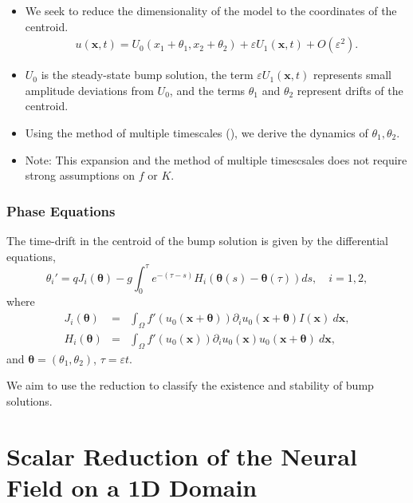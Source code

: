 \documentclass{beamer}
\newcommand{\x}{\mathbf{x}}
\newcommand{\q}{\boldsymbol{\theta}}
\newcommand{\io}{\int_\Omega}
\newcommand{\ve}{\varepsilon}
\newcommand{\pa}{\partial}
\begin{document}
\begin{frame}
\begin{itemize}
\item We seek to reduce the dimensionality of the model to the coordinates of the centroid.
  \begin{equation*}
  \begin{split}
   u(\x,t) = U_0(x_1+\theta_1,x_2+\theta_2) + \ve U_1(\x,t) + O(\ve^2).
  \end{split}
 \end{equation*}
 \item $U_0$ is the steady-state bump solution, the term $\ve U_1(\x,t)$ represents small amplitude deviations from $U_0$, and the terms $\theta_1$ and $\theta_2$ represent drifts of the centroid.
 \item Using the method of multiple timescales (\cite{keener}), we derive the dynamics of $\theta_1, \theta_2$.
 \item Note: This expansion and the method of multiple timescsales does not require strong assumptions on $f$ or $K$.
\end{itemize}
\end{frame}

\begin{frame}
\frametitle{Phase Equations}
The time-drift in the centroid of the bump solution is given by the differential equations,
\begin{equation*}
\theta_i' = qJ_i(\q) -g\int_0^\tau e^{-(\tau-s)} H_i(\q(s)-\q(\tau))ds, \quad i=1,2,
\end{equation*}
where
\begin{eqnarray*}
J_i(\q) &=& \io f'(u_0(\x+\q))\pa_i u_0(\x+\q)I(\x)\ d\x,\\
H_i(\q) &=& \io f'(u_0(\x))\pa_i u_0(\x) u_0(\x+\q)\ d\x,
\end{eqnarray*} 
and $\q = (\theta_1,\theta_2)$, $\tau = \ve t$.

We aim to use the reduction to classify the existence and stability of bump solutions.
\end{frame}

\section[Scalar Reduction (1D)]{Scalar Reduction of the Neural Field on a 1D Domain}
\end{document}
